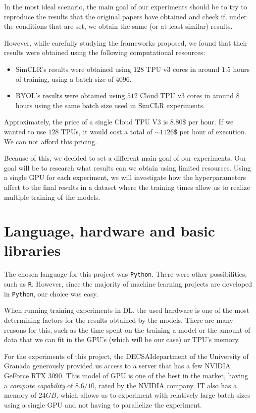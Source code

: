 In the most ideal scenario, the main goal of our experiments should be to try to reproduce the results that the original papers have obtained and check if, under the conditions that are set, we obtain the same (or at least similar) results.

However, while carefully studying the frameworks proposed, we found that their results were obtained using the following computational resources:
\begin{itemize}
\item SimCLR's results were obtained using $128$ TPU v3 cores in around $1.5$ hours of training, using a batch size of $4096$.
\item BYOL's results were obtained using $512$ Cloud TPU v3 cores in around $8$ hours using the same batch size used in SimCLR experiments.
\end{itemize}

Approximately, the price of a single Cloud TPU V3 is $8.80\$$ per hour. If we wanted to use $128$ TPUs, it would cost a total of $\sim 1126 \$$  per hour of execution. We can not afford this pricing. 

Because of this, we decided to set a different main goal of our experiments. Our goal will be to research what results can we obtain using limited resources. Using a single GPU for each experiment, we will investigate how the hyperparameters affect to the final results in a dataset where the training times allow us to realize multiple training of the models.


\section{Language, hardware and basic libraries}

The chosen language for this project was \lstinline{Python}. There were other possibilities, such as \lstinline{R}. However, since the majority of machine learning projects are developed in \lstinline{Python}, our choice was easy.

When running training experiments in DL, the used hardware is one of the most determining factors for the results obtained by the models. There are many reasons for this, such as the time spent on the training a model or the amount of  data that we can fit in the GPU's (which will be our case) or TPU's memory.

For the experiments of this project, the DECSAI\footnotemark department of the University of Granada generously provided us access to a server that has a few NVIDIA GeForce RTX 3090. This model of GPU is one of the best in the market, having a \emph{compute capability} of $8.6/10$, rated by the NVIDIA company. IT also has a memory of $24GB$, which allows us to experiment with relatively large batch sizes using a single GPU and not having to parallelize the experiment.

